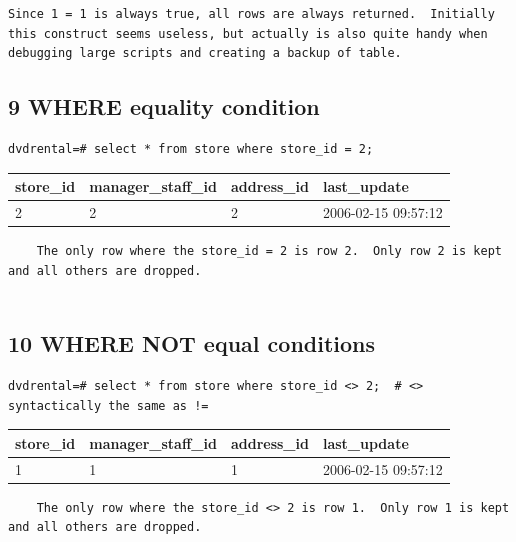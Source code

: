 \documentclass[]{book}
\theoremstyle{definition}
\theoremstyle{definition}
\theoremstyle{definition}
\theoremstyle{remark}
\begin{document}
\begin{verbatim}
Since 1 = 1 is always true, all rows are always returned.  Initially this construct seems useless, but actually is also quite handy when debugging large scripts and creating a backup of table.
\end{verbatim}

\hypertarget{where-equality-condition}{%
\subsection{9 WHERE equality condition}\label{where-equality-condition}}

\begin{verbatim}
dvdrental=# select * from store where store_id = 2;
\end{verbatim}

\begin{longtable}[]{@{}llll@{}}
\toprule
store\_id & manager\_staff\_id & address\_id &
last\_update\tabularnewline
\midrule
\endhead
2 & 2 & 2 & 2006-02-15 09:57:12\tabularnewline
\bottomrule
\end{longtable}

\begin{verbatim}
    The only row where the store_id = 2 is row 2.  Only row 2 is kept and all others are dropped.
    
\end{verbatim}

\hypertarget{where-not-equal-conditions}{%
\subsection{10 WHERE NOT equal
conditions}\label{where-not-equal-conditions}}

\begin{verbatim}
dvdrental=# select * from store where store_id <> 2;  # <> syntactically the same as !=
\end{verbatim}

\begin{longtable}[]{@{}llll@{}}
\toprule
store\_id & manager\_staff\_id & address\_id &
last\_update\tabularnewline
\midrule
\endhead
1 & 1 & 1 & 2006-02-15 09:57:12\tabularnewline
\bottomrule
\end{longtable}

\begin{verbatim}
    The only row where the store_id <> 2 is row 1.  Only row 1 is kept and all others are dropped.
\end{verbatim}
\end{document}
